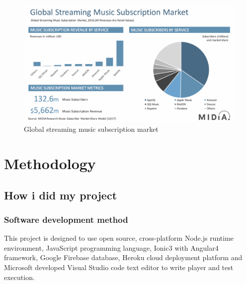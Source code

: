 \begin{figure}[h]
	\centering
	\includegraphics[scale=0.4]{img/forecast2.png}
	\caption{Global streaming music subscription market}
	\label{fig:2.2 cubed graph}
\end{figure}

\chapter{Methodology}

\section{How i did my project}
\subsection{Software development method}
This project is designed to use open source, cross-platform Node.js runtime environment, JavaScript programming language, Ionic3 with Angular4 framework, Google Firebase database, Heroku cloud deployment platform and Microsoft developed Visual Studio code text editor to write player and test execution. 
